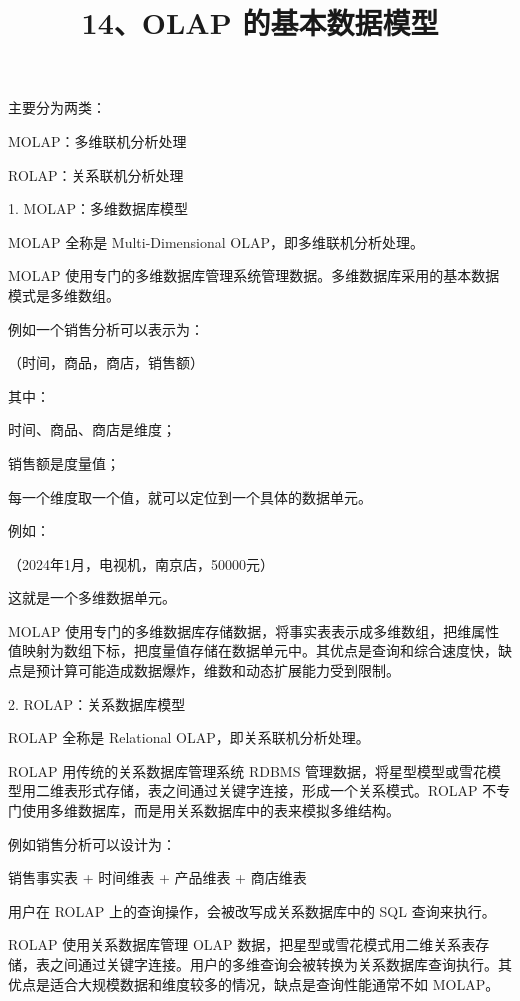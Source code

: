 \documentclass[UTF8,zihao=-4]{ctexart}
\begin{document}
\title{14、OLAP 的基本数据模型}
\author{}
\date{}
\maketitle

主要分为两类：\par
MOLAP：多维联机分析处理\par
ROLAP：关系联机分析处理\par

1. MOLAP：多维数据库模型\par

MOLAP 全称是 Multi-Dimensional OLAP，即多维联机分析处理。\par
MOLAP 使用专门的多维数据库管理系统管理数据。多维数据库采用的基本数据模式是多维数组。\par

例如一个销售分析可以表示为：\par

（时间，商品，商店，销售额）\par

其中：\par

时间、商品、商店是维度；\par
销售额是度量值；\par
每一个维度取一个值，就可以定位到一个具体的数据单元。\par

例如：\par

（2024年1月，电视机，南京店，50000元）\par

这就是一个多维数据单元。\par

MOLAP 使用专门的多维数据库存储数据，将事实表表示成多维数组，把维属性值映射为数组下标，把度量值存储在数据单元中。其优点是查询和综合速度快，缺点是预计算可能造成数据爆炸，维数和动态扩展能力受到限制。\par

2. ROLAP：关系数据库模型\par

ROLAP 全称是 Relational OLAP，即关系联机分析处理。\par

ROLAP 用传统的关系数据库管理系统 RDBMS 管理数据，将星型模型或雪花模型用二维表形式存储，表之间通过关键字连接，形成一个关系模式。ROLAP 不专门使用多维数据库，而是用关系数据库中的表来模拟多维结构。\par

例如销售分析可以设计为：\par

销售事实表 + 时间维表 + 产品维表 + 商店维表\par

用户在 ROLAP 上的查询操作，会被改写成关系数据库中的 SQL 查询来执行。\par

ROLAP 使用关系数据库管理 OLAP 数据，把星型或雪花模式用二维关系表存储，表之间通过关键字连接。用户的多维查询会被转换为关系数据库查询执行。其优点是适合大规模数据和维度较多的情况，缺点是查询性能通常不如 MOLAP。\par
\end{document}

